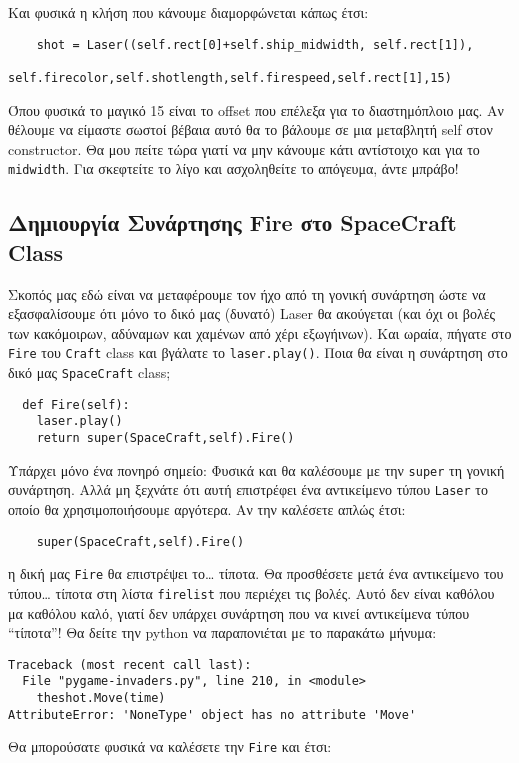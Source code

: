 Και φυσικά η κλήση που κάνουμε διαμορφώνεται κάπως έτσι:

\begin{verbatim}
    shot = Laser((self.rect[0]+self.ship_midwidth, self.rect[1]),
                  self.firecolor,self.shotlength,self.firespeed,self.rect[1],15)
\end{verbatim}

Όπου φυσικά το μαγικό 15 είναι το offset που επέλεξα για το διαστημόπλοιο μας. Αν θέλουμε να είμαστε σωστοί βέβαια αυτό θα το βάλουμε σε μια μεταβλητή self στον constructor. Θα μου πείτε τώρα γιατί να μην κάνουμε κάτι αντίστοιχο και για το {\tt midwidth}. Για σκεφτείτε το λίγο και ασχοληθείτε το απόγευμα, άντε μπράβο!

\subsection{Δημιουργία Συνάρτησης Fire στο SpaceCraft Class}

Σκοπός μας εδώ είναι να μεταφέρουμε τον ήχο από τη γονική συνάρτηση ώστε να εξασφαλίσουμε ότι μόνο το δικό μας (δυνατό) Laser θα ακούγεται (και όχι οι βολές των κακόμοιρων, αδύναμων και χαμένων από χέρι εξωγήινων). Και ωραία, πήγατε στο {\tt Fire} του {\tt Craft} class και βγάλατε το {\tt laser.play()}.  Ποια θα είναι η συνάρτηση στο δικό μας {\tt SpaceCraft} class;

\begin{verbatim}
  def Fire(self):
    laser.play()
    return super(SpaceCraft,self).Fire()
\end{verbatim}

Υπάρχει μόνο ένα πονηρό σημείο: Φυσικά και θα καλέσουμε με την {\tt super} τη γονική συνάρτηση. Αλλά μη ξεχνάτε ότι αυτή επιστρέφει ένα αντικείμενο τύπου {\tt Laser} το οποίο θα χρησιμοποιήσουμε αργότερα. Αν την καλέσετε απλώς έτσι:

\begin{verbatim}
    super(SpaceCraft,self).Fire()
\end{verbatim}

η δική μας {\tt Fire} θα επιστρέψει το\ldots{} τίποτα. Θα προσθέσετε μετά ένα αντικείμενο του τύπου\ldots{} τίποτα στη λίστα {\tt firelist} που περιέχει τις βολές. Αυτό δεν είναι καθόλου μα καθόλου καλό, γιατί δεν υπάρχει συνάρτηση που να κινεί αντικείμενα τύπου ``τίποτα''! Θα δείτε την python να παραπονιέται με το παρακάτω μήνυμα:
%
\begin{verbatim}
Traceback (most recent call last):
  File "pygame-invaders.py", line 210, in <module>
    theshot.Move(time)
AttributeError: 'NoneType' object has no attribute 'Move'
\end{verbatim}
%
Θα μπορούσατε φυσικά να καλέσετε την {\tt Fire} και έτσι:

